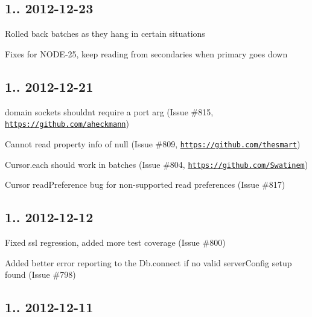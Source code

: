 \subsection*{1.. 2012-\/12-\/23 }


\begin{DoxyItemize}
\item Rolled back batches as they hang in certain situations
\item Fixes for N\+O\+D\+E-\/25, keep reading from secondaries when primary goes down
\end{DoxyItemize}

\subsection*{1.. 2012-\/12-\/21 }


\begin{DoxyItemize}
\item domain sockets shouldn\textquotesingle{}t require a port arg (Issue \#815, \href{https://github.com/aheckmann}{\tt https\+://github.\+com/aheckmann})
\item Cannot read property \textquotesingle{}info\textquotesingle{} of null (Issue \#809, \href{https://github.com/thesmart}{\tt https\+://github.\+com/thesmart})
\item Cursor.\+each should work in batches (Issue \#804, \href{https://github.com/Swatinem}{\tt https\+://github.\+com/\+Swatinem})
\item Cursor read\+Preference bug for non-\/supported read preferences (Issue \#817)
\end{DoxyItemize}

\subsection*{1.. 2012-\/12-\/12 }


\begin{DoxyItemize}
\item Fixed ssl regression, added more test coverage (Issue \#800)
\item Added better error reporting to the Db.\+connect if no valid server\+Config setup found (Issue \#798)
\end{DoxyItemize}

\subsection*{1.. 2012-\/12-\/11 }


